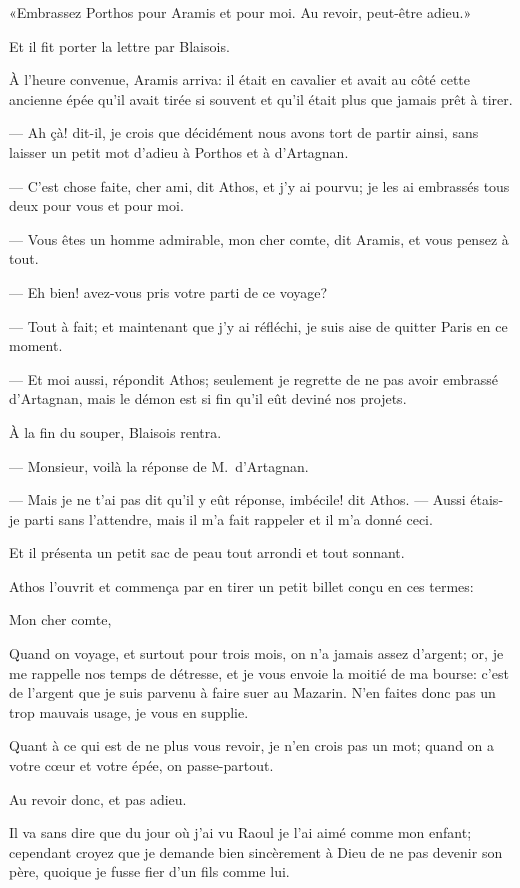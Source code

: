 «Embrassez Porthos pour Aramis et pour moi. Au revoir, peut-être adieu.»

Et il fit porter la lettre par Blaisois.

À l'heure convenue, Aramis arriva: il était en cavalier et avait au côté cette ancienne épée qu'il avait tirée si souvent et qu'il était plus que jamais prêt à tirer.

— Ah çà! dit-il, je crois que décidément nous avons tort de partir ainsi, sans laisser un petit mot d'adieu à Porthos et à d'Artagnan.

— C'est chose faite, cher ami, dit Athos, et j'y ai pourvu; je les ai embrassés tous deux pour vous et pour moi.

— Vous êtes un homme admirable, mon cher comte, dit Aramis, et vous pensez à tout.

— Eh bien! avez-vous pris votre parti de ce voyage?

— Tout à fait; et maintenant que j'y ai réfléchi, je suis aise de quitter Paris en ce moment.

— Et moi aussi, répondit Athos; seulement je regrette de ne pas avoir embrassé d'Artagnan, mais le démon est si fin qu'il eût deviné nos projets.

À la fin du souper, Blaisois rentra.

— Monsieur, voilà la réponse de M.~d'Artagnan.

— Mais je ne t'ai pas dit qu'il y eût réponse, imbécile! dit Athos.
— Aussi étais-je parti sans l'attendre, mais il m'a fait rappeler et il m'a donné ceci.

Et il présenta un petit sac de peau tout arrondi et tout sonnant.

Athos l'ouvrit et commença par en tirer un petit billet conçu en ces termes:

\begin{mail}{}{Mon cher comte,}

Quand on voyage, et surtout pour trois mois, on n'a jamais assez d'argent; or, je me rappelle nos temps de détresse, et je vous envoie la moitié de ma bourse: c'est de l'argent que je suis parvenu à faire suer au Mazarin. N'en faites donc pas un trop mauvais usage, je vous en supplie.

Quant à ce qui est de ne plus vous revoir, je n'en crois pas un mot; quand on a votre cœur et votre épée, on passe-partout.

Au revoir donc, et pas adieu.

Il va sans dire que du jour où j'ai vu Raoul je l'ai aimé comme mon enfant; cependant croyez que je demande bien sincèrement à Dieu de ne pas devenir son père, quoique je fusse fier d'un fils comme lui.



\end{mail}

